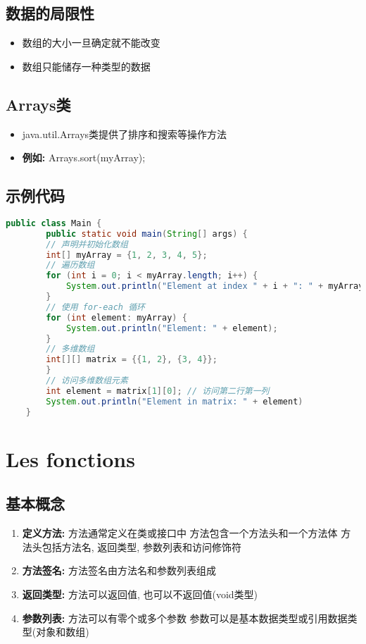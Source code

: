 \documentclass{article}
\begin{document}
\subsection{ 数据的局限性}
\begin{itemize}
    \item 数组的大小一旦确定就不能改变
    \item 数组只能储存一种类型的数据
\end{itemize}
\subsection{ Arrays类}
\begin{itemize}
    \item java.util.Arrays类提供了排序和搜索等操作方法
    \item \textbf{例如:} Arrays.sort(myArray);
\end{itemize}
\subsection{ 示例代码}
\begin{tcolorbox}
    \begin{lstlisting}[language = java]
    public class Main {
        public static void main(String[] args) {
        // 声明并初始化数组
        int[] myArray = {1, 2, 3, 4, 5};
        // 遍历数组
        for (int i = 0; i < myArray.length; i++) {
            System.out.println("Element at index " + i + ": " + myArray[i]);
        }
        // 使用 for-each 循环
        for (int element: myArray) {
            System.out.println("Element: " + element);
        }
        // 多维数组
        int[][] matrix = {{1, 2}, {3, 4}};
        }
        // 访问多维数组元素
        int element = matrix[1][0]; // 访问第二行第一列
        System.out.println("Element in matrix: " + element)
    }
\end{lstlisting}
\end{tcolorbox}
\section{Les fonctions}
\subsection{ 基本概念}
\begin{enumerate}
    \item \textbf{定义方法:}
    \subitem 方法通常定义在类或接口中
    \subitem 方法包含一个方法头和一个方法体
    \subitem 方法头包括方法名, 返回类型, 参数列表和访问修饰符
    \item \textbf{方法签名:}
    \subitem 方法签名由方法名和参数列表组成
    \item \textbf{返回类型:}
    \subitem 方法可以返回值, 也可以不返回值(void类型)
    \item \textbf{参数列表:}
    \subitem 方法可以有零个或多个参数
    \subitem 参数可以是基本数据类型或引用数据类型(对象和数组)
\end{enumerate}
\end{document}
